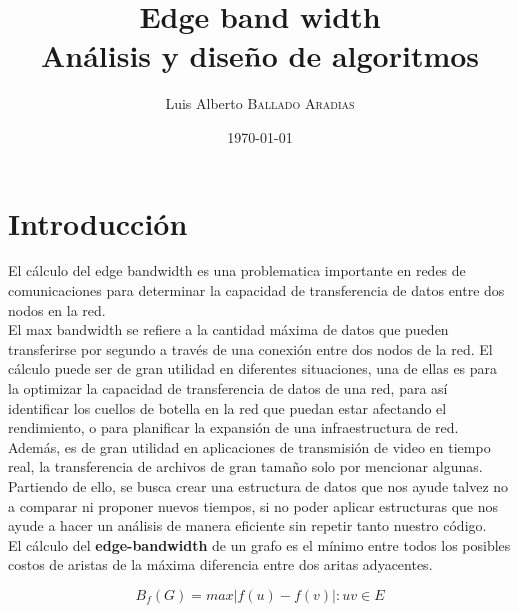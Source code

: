 \documentclass[
	letterpaper, %
	10pt, %
]{CSUniSchoolLabReport}
\title{Edge band width \\ Análisis y diseño de algoritmos} %
\author{Luis Alberto \textsc{Ballado Aradias}} %
\date{\today} %
\begin{document}
\maketitle %



\section{Introducción}

El cálculo del edge bandwidth es una problematica importante en redes de comunicaciones para determinar la capacidad de transferencia de datos entre dos nodos en la red.\\

El max bandwidth se refiere a la cantidad máxima de datos que pueden transferirse por segundo a través de una conexión entre dos nodos de la red. El cálculo puede ser de gran utilidad en diferentes situaciones, una de ellas es para la optimizar la capacidad de transferencia de datos de una red, para así identificar los cuellos de botella en la red que puedan estar afectando el rendimiento, o para planificar la expansión de una infraestructura de red. Además, es de gran utilidad en aplicaciones de transmisión de video en tiempo real, la transferencia de archivos de gran tamaño solo por mencionar algunas.\\

Partiendo de ello, se busca crear una estructura de datos que nos ayude talvez no a comparar ni proponer nuevos tiempos, si no poder aplicar estructuras que nos ayude a hacer un análisis de manera eficiente sin repetir tanto nuestro código.\\

El cálculo del \textbf{edge-bandwidth} de un grafo es el mínimo entre todos los posibles costos de aristas de la máxima diferencia entre dos aritas adyacentes. 

\begin{center}
  \[B_f(G) = max{|f(u)-f(v)|: uv \in E}\]
\end{center}
\end{document}
